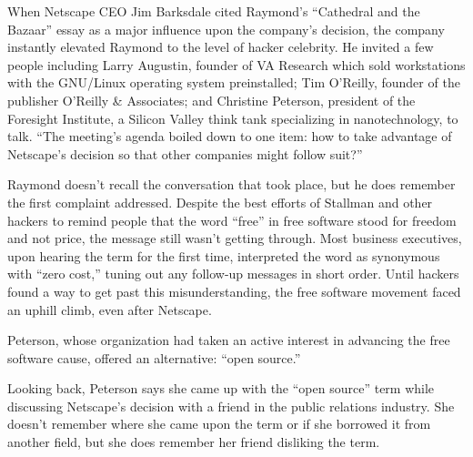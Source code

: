 \ifdefined\chs

\fi

\ifdefined\eng
When Netscape CEO Jim Barksdale cited Raymond's ``Cathedral and the Bazaar'' essay as a major influence upon the company's decision, the company instantly elevated Raymond to the level of hacker celebrity. He invited a few people including Larry Augustin, founder of VA Research which sold workstations with the GNU/Linux operating system preinstalled; Tim O'Reilly,  founder of the publisher O'Reilly \& Associates; and Christine Peterson, president of the Foresight Institute, a Silicon Valley think tank specializing in nanotechnology, to talk. ``The meeting's agenda boiled down to one item: how to take advantage of Netscape's decision so that other companies might follow suit?''
\fi

\ifdefined\chs

\fi

\ifdefined\eng
Raymond doesn't recall the conversation that took place, but he does remember the first complaint addressed. Despite the best efforts of Stallman and other hackers to remind people that the word ``free'' in free software stood for freedom and not price, the message still wasn't getting through. Most business executives, upon hearing the term for the first time, interpreted the word as synonymous with ``zero cost,'' tuning out any follow-up messages in short order. Until hackers found a way to get past this misunderstanding, the free software movement faced an uphill climb, even after Netscape.
\fi

\ifdefined\chs

\fi

\ifdefined\eng
Peterson, whose organization had taken an active interest in advancing the free software cause, offered an alternative: ``open source.''
\fi

\ifdefined\chs

\fi

\ifdefined\eng
Looking back, Peterson says she came up with the ``open source'' term while discussing Netscape's decision with a friend in the public relations industry. She doesn't remember where she came upon the term or if she borrowed it from another field, but she does remember her friend disliking the term.
\fi

\ifdefined\chs

